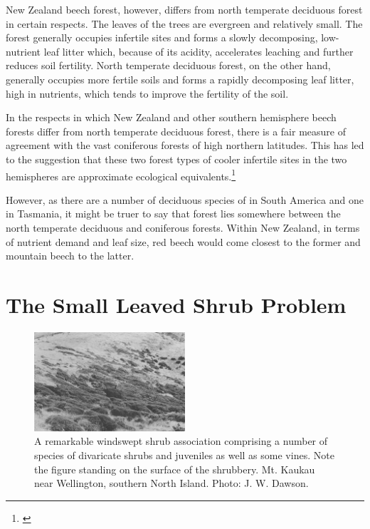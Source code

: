 New Zealand beech forest, however, differs from north temperate deciduous forest in certain respects.
The leaves of the trees are evergreen and relatively small.
The forest generally occupies infertile sites and forms a slowly decomposing, low-nutrient leaf litter which, because of its acidity, accelerates leaching and further reduces soil fertility.
North temperate deciduous forest, on the other hand, generally occupies more fertile soils and forms a rapidly decomposing leaf litter, high in nutrients, which tends to improve the fertility of the soil.

In the respects in which New Zealand and other southern hemisphere beech forests differ from north temperate deciduous forest, there is a fair measure of agreement with the vast coniferous forests of high northern latitudes.
This has led to the suggestion that these two forest types of cooler infertile sites in the two hemispheres are approximate ecological equivalents.\footnote{\cite{dansereau1964six}}

However, as there are a number of deciduous species of  in South America and one in Tasmania, it might be truer to say that  forest lies somewhere between the north temperate deciduous and coniferous forests.
Within New Zealand, in terms of nutrient demand and leaf size, red beech would come closest to the former and mountain beech to the latter.

\chapter{The Small Leaved Shrub Problem}

\begin{figure}
	\includegraphics[width=0.5\textwidth]{graphics/figure74shrubs.jpg}
	\centering
	\caption[A remarkable windswept shrub association]{A remarkable windswept shrub association comprising a number of species of divaricate shrubs and juveniles as well as some vines.
	Note the figure standing on the surface of the shrubbery.
	Mt. Kaukau near Wellington, southern North Island.
	Photo: J. W. Dawson.}%
	\label{fig:74shrubs}
\end{figure}

